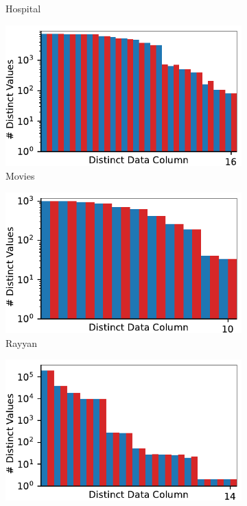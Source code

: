 \begin{figure}[!t]
\begin{subfigure}{0.32\textwidth}
    \caption{Hospital}
    \label{fig:distincts_hospitals}
\end{subfigure}
\hfill
\begin{subfigure}{0.32\textwidth}
    \includegraphics[width=\textwidth]{figures/plot/distinct/movies_distinct/combined.pdf}
    \caption{Movies}
    \label{exp:distincts_movies}
\end{subfigure}
\hfill
\begin{subfigure}{0.32\textwidth}
    \includegraphics[width=\textwidth]{figures/plot/distinct/rayyan_distinct/combined.pdf}
    \caption{Rayyan}
    \label{exp:distincts_rayyan}
\end{subfigure}
\hfill
\begin{subfigure}{0.32\textwidth}
    \includegraphics[width=\textwidth]{figures/plot/distinct/tax_distinct/combined.pdf}

\end{subfigure}
\end{figure}
